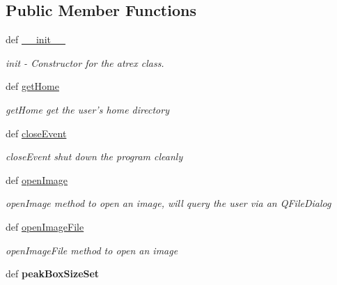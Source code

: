 \subsection*{Public Member Functions}
\begin{DoxyCompactItemize}
\item 
def \hyperlink{classAtrex_1_1Atrex_a3c7c6f6088f83b942d6773648e1e6347}{\-\_\-\-\_\-init\-\_\-\-\_\-}
\begin{DoxyCompactList}\small\item\em init -\/ Constructor for the atrex class. \end{DoxyCompactList}\item 
\hypertarget{classAtrex_1_1Atrex_a6877cdfc8717ffc47d5e25a7fa1385f3}{def \hyperlink{classAtrex_1_1Atrex_a6877cdfc8717ffc47d5e25a7fa1385f3}{get\-Home}}\label{classAtrex_1_1Atrex_a6877cdfc8717ffc47d5e25a7fa1385f3}

\begin{DoxyCompactList}\small\item\em get\-Home get the user's home directory \end{DoxyCompactList}\item 
\hypertarget{classAtrex_1_1Atrex_a500ea9d7087f2aaf505f87998d1cf526}{def \hyperlink{classAtrex_1_1Atrex_a500ea9d7087f2aaf505f87998d1cf526}{close\-Event}}\label{classAtrex_1_1Atrex_a500ea9d7087f2aaf505f87998d1cf526}

\begin{DoxyCompactList}\small\item\em close\-Event shut down the program cleanly \end{DoxyCompactList}\item 
\hypertarget{classAtrex_1_1Atrex_aab80061d4d2127e82b592cbf5baef054}{def \hyperlink{classAtrex_1_1Atrex_aab80061d4d2127e82b592cbf5baef054}{open\-Image}}\label{classAtrex_1_1Atrex_aab80061d4d2127e82b592cbf5baef054}

\begin{DoxyCompactList}\small\item\em open\-Image method to open an image, will query the user via an Q\-File\-Dialog \end{DoxyCompactList}\item 
def \hyperlink{classAtrex_1_1Atrex_a25ef435a888471b35045f63fad55b176}{open\-Image\-File}
\begin{DoxyCompactList}\small\item\em open\-Image\-File method to open an image \end{DoxyCompactList}\item 
\hypertarget{classAtrex_1_1Atrex_ab96f78f24269b2608673faa9cec31ad8}{def {\bfseries peak\-Box\-Size\-Set}}\label{classAtrex_1_1Atrex_ab96f78f24269b2608673faa9cec31ad8}


\end{DoxyCompactItemize}
